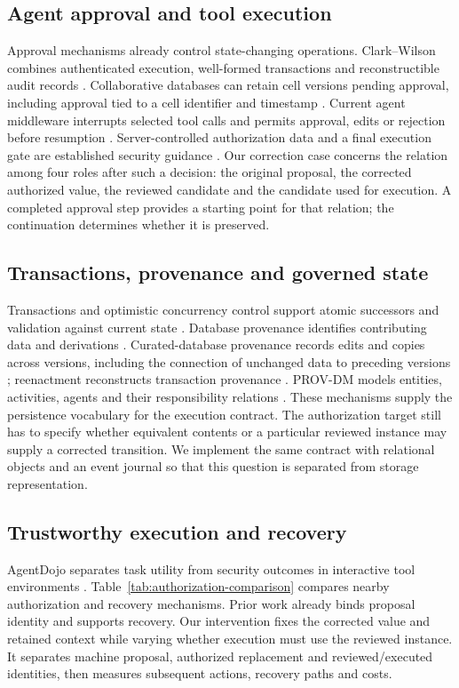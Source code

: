 \documentclass[10pt,a4paper,twocolumn]{article}
\begin{document}
\subsection{Agent approval and tool execution}
Approval mechanisms already control state-changing operations. Clark--Wilson combines authenticated execution, well-formed transactions and reconstructible audit records \citep{clark1987integrity}. Collaborative databases can retain cell versions pending approval, including approval tied to a cell identifier and timestamp \citep{mershad2015approval}. Current agent middleware interrupts selected tool calls and permits approval, edits or rejection before resumption \citep{langchainHITL}. Server-controlled authorization data and a final execution gate are established security guidance \citep{owaspTransactionAuthorization}. Our correction case concerns the relation among four roles after such a decision: the original proposal, the corrected authorized value, the reviewed candidate and the candidate used for execution. A completed approval step provides a starting point for that relation; the continuation determines whether it is preserved.

\subsection{Transactions, provenance and \mbox{governed} state}
Transactions and optimistic concurrency control support atomic successors and validation against current state \citep{gray1981transaction,kung1981occ}. Database provenance identifies contributing data and derivations \citep{buneman2001whywhere,cheney2009provenance}. Curated-database provenance records edits and copies across versions, including the connection of unchanged data to preceding versions \citep{buneman2006curated}; reenactment reconstructs transaction provenance \citep{arab2018reenactment}. PROV-DM models entities, activities, agents and their responsibility relations \citep{moreau2013provdm}. These mechanisms supply the persistence vocabulary for the execution contract. The authorization target still has to specify whether equivalent contents or a particular reviewed instance may supply a corrected transition. We implement the same contract with relational objects and an event journal so that this question is separated from storage representation.

\subsection{Trustworthy execution and \mbox{recovery}}
AgentDojo separates task utility from security outcomes in interactive tool environments \citep{debenedetti2024agentdojo}. Table~\ref{tab:authorization-comparison} compares nearby authorization and recovery mechanisms. Prior work already binds proposal identity and supports recovery. Our intervention fixes the corrected value and retained context while varying whether execution must use the reviewed instance. It separates machine proposal, authorized replacement and reviewed/executed identities, then measures subsequent actions, recovery paths and costs.
\end{document}

